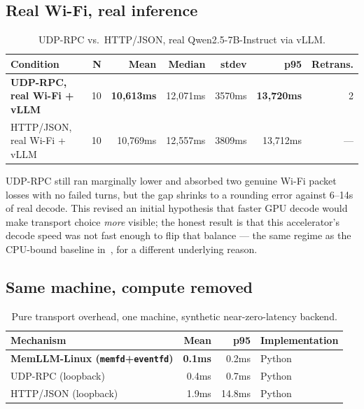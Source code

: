 \documentclass[11pt]{article}
\begin{document}
\subsection{Real Wi-Fi, real inference}

\begin{table}[htbp]
\centering
\caption{UDP-RPC vs.\ HTTP/JSON, real Qwen2.5-7B-Instruct via vLLM.}
\label{tab:wifi-vllm}
\begin{tabular}{lrrrrrr}
\toprule
Condition & N & Mean & Median & stdev & p95 & Retrans.\\
\midrule
\textbf{UDP-RPC, real Wi-Fi + vLLM} & 10 & \textbf{10{,}613ms} & 12{,}071ms & 3570ms & \textbf{13{,}720ms} & 2 \\
HTTP/JSON, real Wi-Fi + vLLM & 10 & 10{,}769ms & 12{,}557ms & 3809ms & 13{,}712ms & --- \\
\bottomrule
\end{tabular}
\end{table}

UDP-RPC still ran marginally lower and absorbed two genuine Wi-Fi packet losses with no failed turns, but the gap shrinks to a rounding error against 6--14s of real decode. This revised an initial hypothesis that faster GPU decode would make transport choice \emph{more} visible; the honest result is that this accelerator's decode speed was not fast enough to flip that balance --- the same regime as the CPU-bound baseline in~\cite{memllm}, for a different underlying reason.

\subsection{Same machine, compute removed}

\begin{table}[htbp]
\centering
\caption{Pure transport overhead, one machine, synthetic near-zero-latency backend.}
\label{tab:samemachine}
\begin{tabular}{lrrl}
\toprule
Mechanism & Mean & p95 & Implementation \\
\midrule
\textbf{MemLLM-Linux (\texttt{memfd}+\texttt{eventfd})} & \textbf{0.1ms} & 0.2ms & Python \\
UDP-RPC (loopback) & 0.4ms & 0.7ms & Python \\
HTTP/JSON (loopback) & 1.9ms & 14.8ms & Python \\
\bottomrule
\end{tabular}
\end{table}
\end{document}
